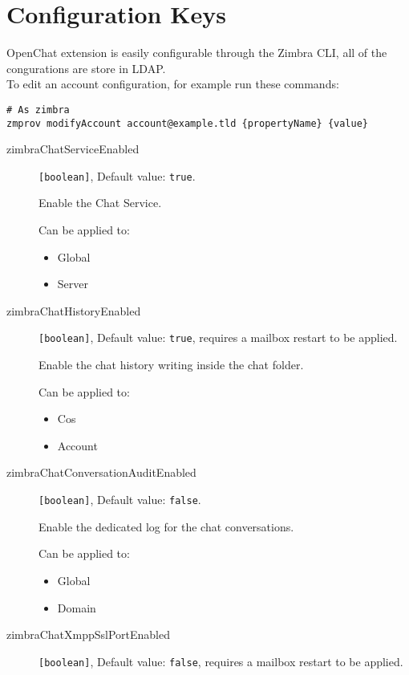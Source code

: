 \section{Configuration Keys}
\label{==sect:confkeys==}

OpenChat extension is easily configurable through the Zimbra CLI, all of the congurations are store in LDAP.\\

To edit an account configuration, for example run these commands:
\begin{verbatim}
# As zimbra
zmprov modifyAccount account@example.tld {propertyName} {value}
\end{verbatim}

\begin{description}
\item [zimbraChatServiceEnabled] \verb+[boolean]+, Default value: \verb+true+.

Enable the Chat Service.

Can be applied to:
\begin{itemize}
    \item Global
    \item Server
\end{itemize}

\item [zimbraChatHistoryEnabled] \verb+[boolean]+, Default value: \verb+true+, requires a mailbox restart to be applied.

Enable the chat history writing inside the chat folder.

Can be applied to:
\begin{itemize}
    \item Cos
    \item Account
\end{itemize}

\item [zimbraChatConversationAuditEnabled] \verb+[boolean]+, Default value: \verb+false+.

Enable the dedicated log for the chat conversations.

Can be applied to:
\begin{itemize}
    \item Global
    \item Domain
\end{itemize}

\item [zimbraChatXmppSslPortEnabled] \verb+[boolean]+, Default value: \verb+false+, requires a mailbox restart to be applied.


\end{description}
